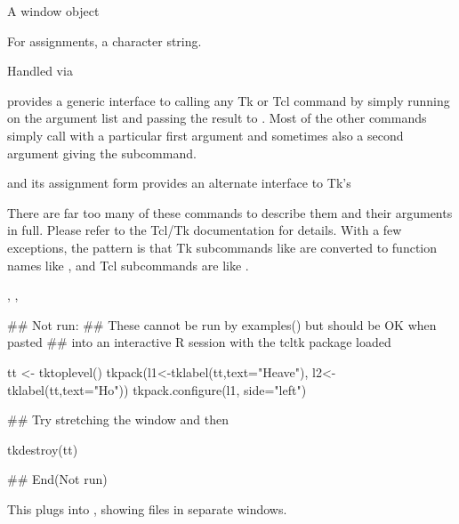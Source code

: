 %
\begin{Arguments}
\begin{ldescription}
\item[\code{x}] A window object
\item[\code{value}] For  assignments, a character string.
\item[\code{...}] Handled via 
\end{ldescription}
\end{Arguments}
%
\begin{Details}\relax

 provides a generic interface to calling any Tk or Tcl
command by simply running  on the argument list
and passing the
result to .  Most of the other commands simply call
 with a particular
first argument and sometimes also a second argument giving the
subcommand.

 and its assignment form provides an alternate interface
to Tk's 

There are far too many of these commands to describe them and their
arguments in full.  Please refer to the Tcl/Tk documentation for details.
With a few exceptions, the pattern is that Tk subcommands like
 are converted to function names like
, and Tcl subcommands are like
.  
\end{Details}
%
\begin{SeeAlso}\relax
{}, ,
\end{SeeAlso}
%
\begin{Examples}
\begin{ExampleCode}
## Not run: 
## These cannot be run by examples() but should be OK when pasted
## into an interactive R session with the tcltk package loaded

tt <- tktoplevel()
tkpack(l1<-tklabel(tt,text="Heave"), l2<-tklabel(tt,text="Ho"))
tkpack.configure(l1, side="left")

## Try stretching the window and then

tkdestroy(tt)

## End(Not run)

\end{ExampleCode}
\end{Examples}
%
\begin{Description}\relax
This plugs into , showing files in separate windows. 
\end{Description}
